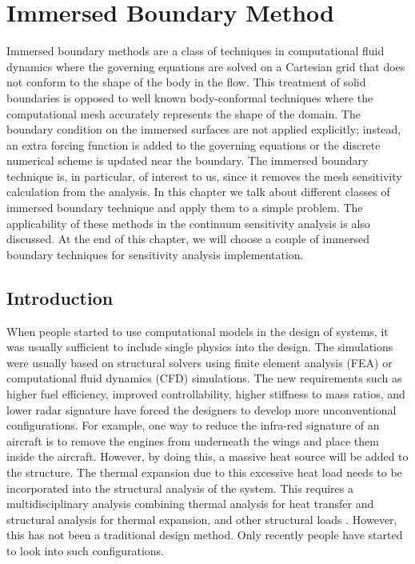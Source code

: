 \chapter{Immersed Boundary Method}\label{ch:immersedBoundary}
Immersed boundary methods are a class of techniques in computational fluid dynamics where the governing equations are solved on a Cartesian grid that does not conform to the shape of the body in the flow. This treatment of solid boundaries is opposed to well known body-conformal techniques where the computational mesh accurately represents the shape of the domain. The boundary condition on the immersed surfaces are not applied explicitly; instead, an extra forcing function is added to the governing equations or the discrete numerical scheme is updated near the boundary. The immersed boundary technique is, in particular, of interest to us, since it removes the mesh sensitivity calculation from the analysis. In this chapter we talk about different classes of immersed boundary technique and apply them to a simple problem. The applicability of these methods in the continuum sensitivity analysis is also discussed. At the end of this chapter, we will choose a couple of immersed boundary techniques for sensitivity analysis implementation.
\section{Introduction}
When people started to use computational models in the design of systems, it was usually sufficient to include single physics into the design. The simulations were usually based on structural solvers using finite element analysis (FEA) or computational fluid dynamics (CFD) simulations. The new requirements such as higher fuel efficiency, improved controllability, higher stiffness to mass ratios, and lower radar signature have forced the designers to develop more unconventional configurations. For example, one way to reduce the infra-red signature of an aircraft is to remove the engines from underneath the wings and place them inside the aircraft. However, by doing this, a massive heat source will be added to the structure. The thermal expansion due to this excessive heat load needs to be incorporated into the structural analysis of the system. This requires a multidisciplinary analysis combining thermal analysis for heat transfer and structural analysis for thermal expansion, and other structural loads \cite{deaton2013stiffening}. However, this has not been a traditional design method. Only recently people have started to look into such configurations.

